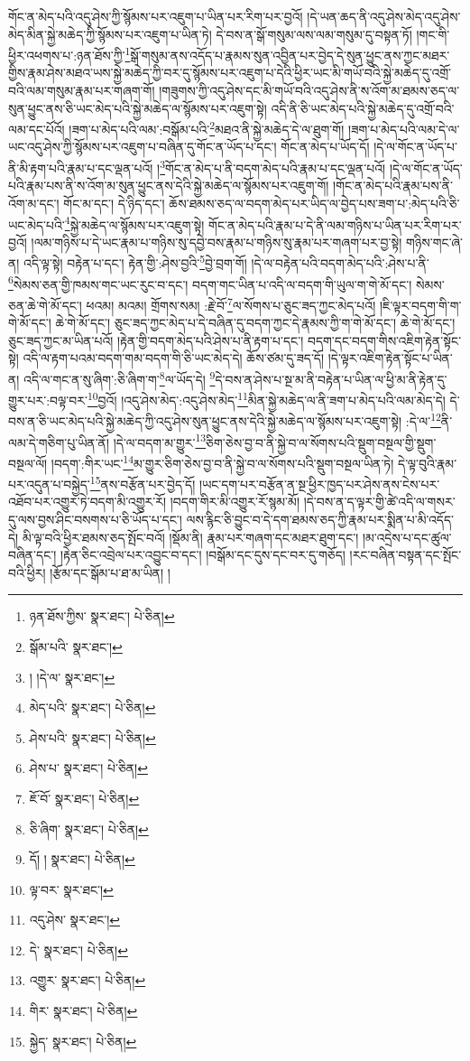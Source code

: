 གོང་ན་མེད་པའི་འདུ་ཤེས་ཀྱི་སྙོམས་པར་འཇུག་པ་ཡིན་པར་རིག་པར་བྱའོ། །དེ་ཡན་ཆད་ནི་འདུ་ཤེས་མེད་འདུ་ཤེས་མེད་མིན་སྐྱེ་མཆེད་ཀྱི་སྙོམས་པར་འཇུག་པ་ཡིན་ཏེ། དེ་བས་ན་སྒོ་གསུམ་ལས་ལམ་གསུམ་དུ་བསྟན་ཏོ། །གང་གི་ཕྱིར་འཕགས་པ་:ཉན་ཐོས་ཀྱི་\footnote{ཉན་ཐོས་ཀྱིས་  སྣར་ཐང་།  པེ་ཅིན། }སྒོ་གསུམ་ནས་འདོད་པ་རྣམས་སུན་འབྱིན་པར་བྱེད་དེ་སུན་ཕྱུང་ནས་ཀྱང་མཐར་གྱིས་རྣམ་ཤེས་མཐའ་ཡས་སྐྱེ་མཆེད་ཀྱི་བར་དུ་སྙོམས་པར་འཇུག་པ་དེའི་ཕྱིར་ཡང་མི་གཡོ་བའི་སྐྱེ་མཆེད་དུ་འགྲོ་བའི་ལམ་གསུམ་རྣམ་པར་གཞག་གོ། །གཟུགས་ཀྱི་འདུ་ཤེས་དང་མི་གཡོ་བའི་འདུ་ཤེས་ནི་ས་འོག་མ་ཐམས་ཅད་ལ་སུན་ཕྱུང་ནས་ཅི་ཡང་མེད་པའི་སྐྱེ་མཆེད་ལ་སྙོམས་པར་འཇུག་སྟེ། འདི་ནི་ཅི་ཡང་མེད་པའི་སྐྱེ་མཆེད་དུ་འགྲོ་བའི་ལམ་དང་པོའོ། །ཟག་པ་མེད་པའི་ལམ་:བསྒོམ་པའི་\footnote{སྒོམ་པའི་  སྣར་ཐང་། }མཐའ་ནི་སྐྱེ་མཆེད་དེ་ལ་ཐུག་གོ། །ཟག་པ་མེད་པའི་ལམ་དེ་ལ་ཡང་འདུ་ཤེས་ཀྱི་སྙོམས་པར་འཇུག་པ་བཞིན་དུ་གོང་ན་ཡོད་པ་དང་། གོང་ན་མེད་པ་ཡོད་དོ། །དེ་ལ་གོང་ན་ཡོད་པ་ནི་མི་རྟག་པའི་རྣམ་པ་དང་ལྡན་པའོ། །\footnote{། །དེ་ལ་  སྣར་ཐང་། }གོང་ན་མེད་པ་ནི་བདག་མེད་པའི་རྣམ་པ་དང་ལྡན་པའོ། །དེ་ལ་གོང་ན་ཡོད་པའི་རྣམ་པས་ནི་ས་འོག་མ་སུན་ཕྱུང་ནས་དེའི་སྐྱེ་མཆེད་ལ་སྙོམས་པར་འཇུག་གོ། །གོང་ན་མེད་པའི་རྣམ་པས་ནི་འོག་མ་དང་། གོང་མ་དང་། དེ་ཉིད་དང་། ཆོས་ཐམས་ཅད་ལ་བདག་མེད་པར་ཡིད་ལ་བྱེད་པས་ཟག་པ་:མེད་པའི་ཅི་ཡང་མེད་པའི་\footnote{མེད་པའི་  སྣར་ཐང་།  པེ་ཅིན། }སྐྱེ་མཆེད་ལ་སྙོམས་པར་འཇུག་སྟེ། གོང་ན་མེད་པའི་རྣམ་པ་དེ་ནི་ལམ་གཉིས་པ་ཡིན་པར་རིག་པར་བྱའོ། །ལམ་གཉིས་པ་དེ་ཡང་རྣམ་པ་གཉིས་སུ་དབྱེ་བས་རྣམ་པ་གཉིས་སུ་རྣམ་པར་གཞག་པར་བྱ་སྟེ། གཉིས་གང་ཞེ་ན། འདི་ལྟ་སྟེ། བརྟེན་པ་དང་། རྟེན་གྱི་:ཤེས་བྱའི་\footnote{ཤེས་པའི་  སྣར་ཐང་།  པེ་ཅིན། }བྱེ་བྲག་གོ། །དེ་ལ་བརྟེན་པའི་བདག་མེད་པའི་:ཤེས་པ་ནི་\footnote{ཤེས་པ་  སྣར་ཐང་།  པེ་ཅིན། }སེམས་ཅན་གྱི་ཁམས་གང་ཡང་རུང་བ་དང་། བདག་གང་ཡིན་པ་འདི་ལ་བདག་གི་ཡུལ་ག་གེ་མོ་དང་། སེམས་ཅན་ཆེ་གེ་མོ་དང་། ཕའམ། མའམ། གྲོགས་སམ། :རྗེ་བོ་\footnote{ཇོ་བོ་  སྣར་ཐང་།  པེ་ཅིན། }ལ་སོགས་པ་ཅུང་ཟད་ཀྱང་མེད་པའོ། །ཇི་ལྟར་བདག་གི་ག་གེ་མོ་དང་། ཆེ་གེ་མོ་དང་། ཅུང་ཟད་ཀྱང་མེད་པ་དེ་བཞིན་དུ་བདག་ཀྱང་དེ་རྣམས་ཀྱི་ག་གེ་མོ་དང་། ཆེ་གེ་མོ་དང་། ཅུང་ཟད་ཀྱང་མ་ཡིན་པའོ། །རྟེན་གྱི་བདག་མེད་པའི་ཤེས་པ་ནི་རྟག་པ་དང་། བདག་དང་བདག་གིས་འཇིག་རྟེན་སྟོང་སྟེ། འདི་ལ་རྟག་པའམ་བདག་གམ་བདག་གི་ཅི་ཡང་མེད་དེ། ཆོས་ཙམ་དུ་ཟད་དོ། །དེ་ལྟར་འཇིག་རྟེན་སྟོང་པ་ཡིན་ན། འདི་ལ་གང་ན་སུ་ཞིག་:ཅི་ཞིག་ག་\footnote{ཅི་ཞིག་  སྣར་ཐང་།  པེ་ཅིན། }ལ་ཡོད་དེ། \footnote{དོ། །   སྣར་ཐང་།  པེ་ཅིན། }དེ་བས་ན་ཤེས་པ་སྔ་མ་ནི་བརྟེན་པ་ཡིན་ལ་ཕྱི་མ་ནི་རྟེན་དུ་གྱུར་པར་:བལྟ་བར་\footnote{ལྟ་བར་  སྣར་ཐང་། }བྱའོ། །འདུ་ཤེས་མེད་:འདུ་ཤེས་མེད་\footnote{འདུ་ཤེས་  སྣར་ཐང་། }མིན་སྐྱེ་མཆེད་ལ་ནི་ཟག་པ་མེད་པའི་ལམ་མེད་དེ། དེ་བས་ན་ཅི་ཡང་མེད་པའི་སྐྱེ་མཆེད་ཀྱི་འདུ་ཤེས་སུན་ཕྱུང་ནས་དེའི་སྐྱེ་མཆེད་ལ་སྙོམས་པར་འཇུག་སྟེ། :དེ་ལ་\footnote{དེ་  སྣར་ཐང་།  པེ་ཅིན། }ནི་ལམ་དེ་གཅིག་པུ་ཡིན་ནོ། །དེ་ལ་བདག་མ་གྱུར་\footnote{འགྱུར་  སྣར་ཐང་།  པེ་ཅིན། }ཅིག་ཅེས་བྱ་བ་ནི་སྐྱེ་བ་ལ་སོགས་པའི་སྡུག་བསྔལ་གྱི་སྡུག་བསྔལ་ལོ། །བདག་:གིར་ཡང་\footnote{གིར་  སྣར་ཐང་།  པེ་ཅིན། }མ་གྱུར་ཅིག་ཅེས་བྱ་བ་ནི་སྐྱེ་བ་ལ་སོགས་པའི་སྡུག་བསྔལ་ཡིན་ཏེ། དེ་ལྟ་བུའི་རྣམ་པར་འདུན་པ་བསྐྱེད་\footnote{སྐྱེད་  སྣར་ཐང་།  པེ་ཅིན། }ནས་བརྩོན་པར་བྱེད་དོ། །ཡང་དག་པར་བརྩོན་ན་སྔ་ཕྱིར་ཁྱད་པར་ཤེས་ནས་ངེས་པར་འཐོབ་པར་འགྱུར་ཏེ་བདག་མི་འགྱུར་རོ། །བདག་གིར་མི་འགྱུར་རོ་སྙམ་མོ། །དེ་བས་ན་ད་ལྟར་གྱི་ཚེ་འདི་ལ་གསར་དུ་ལས་བྱས་ཤིང་བསགས་པ་ཅི་ཡོད་པ་དང་། ལས་རྙིང་ཅི་བྱུང་བ་དེ་དག་ཐམས་ཅད་ཀྱི་རྣམ་པར་སྨིན་པ་མི་འདོད་དེ། མི་ལྟ་བའི་ཕྱིར་ཐམས་ཅད་སྤོང་བའོ། །སྡོམ་ནི། རྣམ་པར་གཞག་དང་མཐར་ཐུག་དང་། །མ་འདྲེས་པ་དང་ཚུལ་བཞིན་དང་། །རྟེན་ཅིང་འབྲེལ་པར་འབྱུང་བ་དང་། །བསྒོམ་དང་དུས་དང་བར་དུ་གཅོད། །རང་བཞིན་བསྟན་དང་སྤོང་བའི་ཕྱིར། །རྩོམ་དང་སྒོམ་པ་ཐ་མ་ཡིན། །
